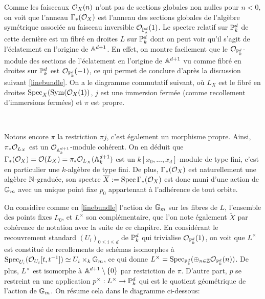 Comme les faisceaux $\mathcal{O}_X(n)$ n'ont pas de sections globales non nulles pour $n<0$, on voit que l'anneau $\Gamma_*(\mathcal{O}_X)$ est l'anneau des sections globales de l'algèbre symétrique associée au faisceau inversible $\mathcal{O}_{\mathbb{P}^d_k}(1)$. Le spectre relatif sur $\mathbb{P}_k^d$ de cette dernière est un fibré en droites $L$ sur $\mathbb{P}_k^d$ dont on peut voir qu'il s'agit de l'éclatement en l'origine de $\mathbb{A}^{d+1}$. En effet, on montre facilement que le $\mathcal{O}_{\mathbb{P}^d_k}$-module des sections de l'éclatement en l'origine de $\mathbb{A}^{d+1}$ vu comme fibré en droites sur $\mathbb{P}_k^d$ est $ \mathcal{O}_{\mathbb{P}^d_k}(-1)$, ce qui permet de conclure d'après la discussion suivant \ref{linebundle}. On a le diagramme commutatif suivant, où $L_X$ est le fibré en droites $\operatorname{Spec}_X(\operatorname{Sym}(\mathcal{O}_X(1))$, $j$ est une immersion fermée (comme recollement d'immersions fermées) et $\pi$ est propre.

	\begin{center}
	\\
	\end{center}
Notons encore $\pi$ la restriction $\pi j$, c'est également un morphisme propre. Ainsi, $\pi_*\mathcal{O}_{L_X}$ est un $\mathcal{O}_{\mathbb{A}_k^{d+1}}$-module cohérent. On en déduit que $\Gamma_*(\mathcal{O}_X)=\mathcal{O}(L_X)=\pi_*\mathcal{O}_{L_X}(\mathbb{A}_k^{d+1})$ est un $k[x_0,...,x_d]$-module de type fini, c'est en particulier une $k$-algèbre de type fini. De plus, $\Gamma_*(\mathcal{O}_X)$ est naturellement une algèbre $\mathbb{N}$-graduée, son spectre $\overline{X}:=\operatorname{Spec} \Gamma_*(\mathcal{O}_X)$ est donc muni d'une action de $\mathbb{G}_m$ avec un unique point fixe $p_0$ appartenant à l'adhérence de tout orbite. 

On considère comme en \ref{linebundle} l'action de $\mathbb{G}_m$ sur les fibres de $L$, l'ensemble des points fixes $L_0$, et $L^\times$ son complémentaire, que l'on note également $\widetilde{X}$ par cohérence de notation avec la suite de ce chapitre. En considérant le recouvrement standard $(U_i)_{0\leq i\leq d}$ de $\mathbb{P}^d_k$ qui trivialise $\mathcal{O}_{\mathbb{P}^d_k}(1)$, on voit que $L^\times$ est constitué de recollements de schémas isomorphes à $\operatorname{Spec}_{U_i}( \mathcal{O}_{U_i}[t,t^{-1}])\simeq U_i \times_k \mathbb{G}_m$, ce qui donne $L^\times=\operatorname{Spec}_{\mathbb{P}^d_k}(\oplus_{n\in \mathbb{Z}}\mathcal{O}_{\mathbb{P}^d_k}(n))$. De plus, $L^\times$ est isomorphe à $\mathbb{A}^{d+1}\setminus\lbrace 0 \rbrace$ par restriction de $\pi$. D'autre part, $p$ se restreint en une application $p^\times:L^\times \rightarrow \mathbb{P}^d_k$ qui est le quotient géométrique de l'action de $\mathbb{G}_m$. On résume cela dans le diagramme ci-dessous:

